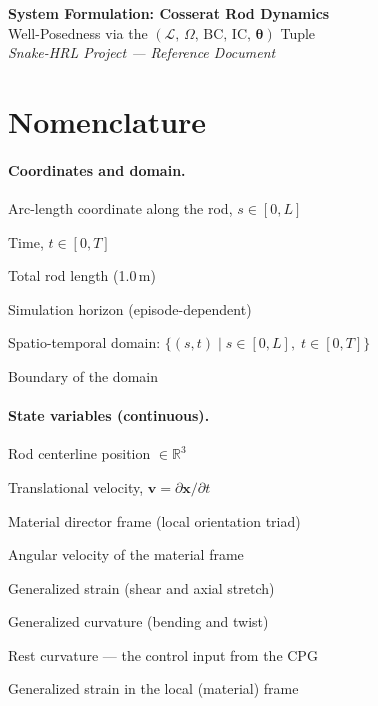 \documentclass[11pt]{article}
\newcommand{\vect}[1]{\mathbf{#1}}
\newcommand{\Real}{\mathbb{R}}
\begin{document}

\begin{center}
  {\Large\bfseries System Formulation: Cosserat Rod Dynamics} \\[0.5em]
  {\large Well-Posedness via the $({\mathcal{L}},\, \Omega,\, \text{BC},\, \text{IC},\, \bm{\theta})$ Tuple} \\[1.5em]
  \textit{Snake-HRL Project --- Reference Document}
\end{center}

\vspace{1em}

\section*{Nomenclature}
\label{sec:nomenclature}

\renewcommand{\arraystretch}{1.25}

\newcommand{\nom}[2]{\item[$#1$] #2}

\paragraph{Coordinates and domain.}
\begin{nomenclature}
  \nom{s}{Arc-length coordinate along the rod, $s \in [0, L]$}
  \nom{t}{Time, $t \in [0, T]$}
  \nom{L}{Total rod length (1.0\,m)}
  \nom{T}{Simulation horizon (episode-dependent)}
  \nom{\Omega}{Spatio-temporal domain: $\{(s, t) \mid s \in [0, L],\; t \in [0, T]\}$}
  \nom{\partial\Omega}{Boundary of the domain}
\end{nomenclature}

\paragraph{State variables (continuous).}
\begin{nomenclature}
  \nom{\vect{x}(s,t)}{Rod centerline position $\in \Real^3$}
  \nom{\vect{v}(s,t)}{Translational velocity, $\vect{v} = \partial\vect{x}/\partial t$}
  \nom{\vect{d}(s,t)}{Material director frame (local orientation triad)}
  \nom{\bm{\omega}(s,t)}{Angular velocity of the material frame}
  \nom{\bm{\varepsilon}(s,t)}{Generalized strain (shear and axial stretch)}
  \nom{\bm{\kappa}(s,t)}{Generalized curvature (bending and twist)}
  \nom{\bm{\kappa}_0(s,t)}{Rest curvature --- the control input from the CPG}
  \nom{\bm{\sigma}(s,t)}{Generalized strain in the local (material) frame}
\end{nomenclature}
\end{document}
